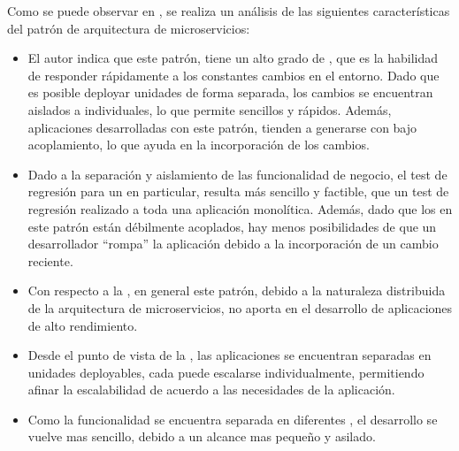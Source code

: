 Como se puede observar en \cite[p.~34]{richards2015}, se realiza un análisis de las siguientes características del patrón de arquitectura de microservicios:

\begin{itemize}

  \item El autor indica que este patrón, tiene un alto grado de , que es la habilidad de responder rápidamente a los constantes cambios en el entorno.  Dado que es posible deployar unidades de forma separada, los cambios se encuentran aislados a  individuales, lo que permite  sencillos y rápidos.
  Además, aplicaciones desarrolladas con este patrón, tienden a generarse con bajo acoplamiento, lo que ayuda en la incorporación de los cambios.

  \item {}
  Dado a la separación y aislamiento de las funcionalidad de negocio, el test de regresión para un  en particular, resulta más sencillo y factible, que un test de regresión realizado a toda una aplicación monolítica.  Además, dado que los  en este patrón están débilmente acoplados, hay menos posibilidades de que un desarrollador ``rompa'' la aplicación debido a la incorporación de un cambio reciente.

  \item Con respecto a la , en general este patrón, debido a la naturaleza distribuida de la arquitectura de microservicios, no aporta en el desarrollo de aplicaciones de alto rendimiento.

  \item Desde el punto de vista de la , las aplicaciones se encuentran separadas en unidades deployables, cada  puede escalarse individualmente, permitiendo afinar la escalabilidad de acuerdo a las necesidades de la aplicación.

  \item {}
  Como la funcionalidad se encuentra separada en diferentes , el desarrollo se vuelve mas sencillo, debido a un alcance mas pequeño y asilado.

\end{itemize}
